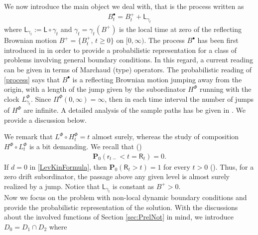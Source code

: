 \documentclass[11pt,a4paper]{article}
\theoremstyle{plain}
\theoremstyle{definition}
\theoremstyle{remark}
\begin{document}
	
	We now introduce the main object we deal with, that is the process  written as
	\begin{align}
		\label{process}
		B^\bullet_t = B^+_t + \mathsf{L}_{\gamma_t}
	\end{align}
	where $\mathsf{L}_{\gamma_t}:= \mathsf{L} \circ \gamma_t$ and $\gamma_t=\gamma_t(B^+)$ is the local time at zero of the reflecting Brownian motion $B^+ = \{B^+_t, \, t\geq 0\}$ on $[0, \infty)$. The process $B^\bullet$ has been first introduced in \cite{ito1963brownian} in order to provide a probabilistic representation for a class of problems involving general boundary conditions. In this regard, a current reading can be given in terms of Marchaud (type) operators. The probabilistic reading of \eqref{process} says that $B^{\bullet}$ is a reflecting Brownian motion jumping away from the origin, with a length of the jump given by the subordinator $H^\Phi$ running with the clock $L^\Phi_{\gamma_t}$. Since $\Pi^\Phi(0,\infty)=\infty$, then in each time interval the number of jumps of $H^\Phi$ are infinite. A  detailed analysis of the sample paths has be given in \cite[section 12]{ito1963brownian}. We provide a discussion below.
	
	
	
	We remark that $L^\Phi \circ H^\Phi_t = t$ almost surely, whereas the study of composition $H^\Phi \circ L^\Phi_t$ is a bit demanding. We recall that (\cite[Proposition 2, section III.2]{bertoin1996levy}) 
	\begin{align*}
		\mathbf{P}_0( \mathsf{r}_{t-} < t = \mathsf{R}_t ) = 0.
	\end{align*}
	If $d = 0$ in \eqref{LevKinFormula}, then $\mathbf{P}_0(\mathsf{R}_t > t) = 1$ for every $t > 0$ (\cite[Theorem 4, section III.2]{bertoin1996levy}). Thus, for a zero drift subordinator, the passage above any given level is almost surely realized by a jump. Notice that $\mathsf{L}_{\gamma_t}$ is constant as $B^+ >0$.\\
	
	
	Now we focus on the problem with non-local dynamic boundary conditions and provide the probabilistic representation of the solution. With the discussions about the involved functions of Section \ref{sec:PrelNot} in mind, we introduce $D_0=D_1 \cap D_2$ where 
	
\end{document}
